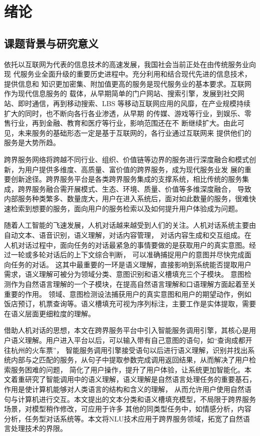 \chapter{绪论}

\section{课题背景与研究意义}

依托以互联网为代表的信息技术的高速发展，我国社会当前正处在由传统服务业向现
代服务业全面升级的重要历史进程中。充分利用和结合现代先进的信息技术，提供信息和
知识更加密集、附加值更高的服务是现代服务业的基本要求。互联网作为现代信息服务的
载体，从早期简单的门户网站、搜索引擎，发展到社交网站、即时通信，再到移动搜索、LBS
等移动互联网应用的风靡，在产业规模持续扩大的同时，也不断向各行各业渗透，从早期
的传媒、游戏等行业，到娱乐、零售行业，再到金融、教育和医疗等行业，影响范围还在不
断继续扩大\cite{王晓玲2015我国现代服务业借力}。由此可见，未来服务的基础形态一定是基于互联网的，各行业通过互联网来
提供他们的服务是大势所趋。


跨界服务网络将跨越不同行业、组织、价值链等边界的服务进行深度融合和模式创新，为用户提供多维度、高质量、富价值的跨界服务，成为现代服务业发
展的重要创新途径。跨界服务平台是各类跨界服务集成的支撑系统，相比传统的服务集成，跨界服务融合需开展模式、生态、环境、质量、价值等多维深度融合，
导致内部服务种类繁多、数量庞大，用户在进入系统后，面对如此数量的服务，很难快速检索到想要的服务，面向用户的服务检索以及如何提升用户体验成为问题。

随着人工智能的飞速发展，人机对话越来越受到人们的关注。人机对话系统主要由自动文本、语音识别，语义理解，对话内容管理，
对话内容生成和交互组成。在人机对话过程中，面向任务的对话最紧急的事情要做的是获取用户的真实意图。经过一轮或多轮对话后的上下文综合判断，
可以准确捕捉用户的意图并尽快完成面向任务的对话。
这其中最重要的一环是语义理解，直接影响到系统能否提取用户需求，语义理解可被分为领域分类、意图识别和语义槽填充三个子模块。
意图检测作为自然语言理解的一个子模块，在提高自然语言理解和口语理解方面起着至关重要的作用。
领域、意图检测设法捕获用户的真实意图和用户的期望动作，例如饭店预订，机票查询等。语义槽填充可视为序列标注，主要工作是实体提取，需要在语义层面更细粒度的理解。

借助人机对话的思想，本文在跨界服务平台中引入智能服务调用引擎，其核心是用户语义理解。用户进入平台以后，可以输入带有自己意图的语句，如“查询成都开往杭州的火车票”，
智能服务调用引擎接受语句以后进行语义理解，识别并找出系统内部与之匹配的服务，从句子中提取参数完成调用返回结果，从而解决了用户检索服务困难的问题，
简化了用户操作，提升了用户体验，让系统更加智能化。本文着重研究了智能调用中的语义理解，语义理解是自然语言处理任务的重要基石，作用是使计算机能够对人类语言的结构和含义的理解，
从而允许用户使用自然语句与计算机进行交互。本文提出的文本分类和语义槽填充模型，不局限于跨界服务场景，对模型稍作修改，可应用于许多
其他的同类型任务中，如情感分析，内容分析，任务型对话系统等。本文将NLU技术应用于跨界服务领域，拓宽了自然语言处理技术的界限。

